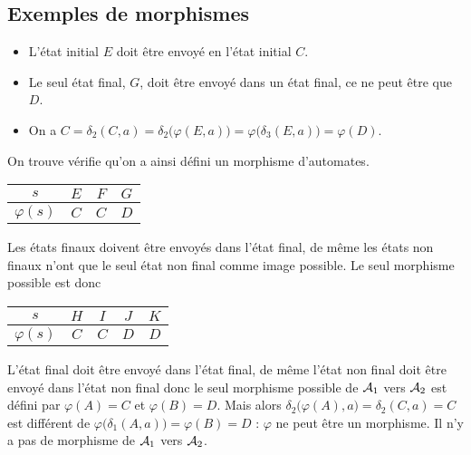 \subsection{Exemples de morphismes}
\begin{Exercise}
\begin{itemize}
\item L'état initial $E$ doit être envoyé en l'état initial $C$.
\item Le seul état final, $G$, doit être envoyé dans un état final, ce ne peut être que $D$.
\item On a $C = \delta_2(C, a) = \delta_2\bigl(\varphi(E, a)\bigr) = \varphi(\delta_3(E, a)\bigr) = \varphi(D)$.
\end{itemize}
On trouve vérifie qu'on a ainsi défini un morphisme d'automates. 
\begin{center}
\begin{tabular}{c|ccc}
         $s$ & $E$ & $F$ & $G$ \\
\hline
$\varphi(s)$ & $C$ & $C$ & $D$ \\
\end{tabular}
\end{center}
\end{Exercise}
\begin{Exercise}
Les états finaux doivent être envoyés dans l'état final, de même les états non finaux n'ont que le seul état non final comme image possible. Le seul morphisme possible est donc
\begin{center}
\begin{tabular}{c|cccc}
         $s$ & $H$ & $I$ & $J$ & $K$ \\
\hline
$\varphi(s)$ & $C$ & $C$ & $D$ & $D$ \\
\end{tabular}
\end{center}
\end{Exercise}
\begin{Exercise}
L'état final doit être envoyé dans l'état final, de même l'état non final doit être envoyé dans l'état non final donc le seul morphisme possible de ${\cal A}_1$ vers ${\cal A}_2$ est défini par $\varphi(A)=C$ et  $\varphi(B)=D$. Mais alors $\delta_2\bigl(\varphi(A), a\bigr)= \delta_2(C, a)= C $ est différent de $\varphi\bigl(\delta_1(A, a)\bigr) = \varphi(B)=D$ : $\varphi$ ne peut être un morphisme. Il n'y a pas de morphisme de ${\cal A}_1$ vers ${\cal A}_2$.
\end{Exercise}
